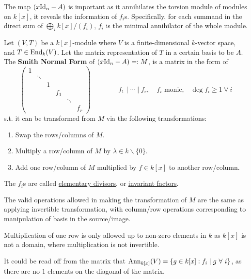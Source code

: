 \documentclass{article}
\begin{document}
The map $(x\mathrm{Id}_n - A)$ is important as it annihilates the torsion module of modules on $k[x]$, it reveals the information of $f_i$s. Specifically, for each summand in the direct sum of $\bigoplus_i k[x]/(f_i)$, $f_i$ is the minimal annihilator of the whole module. 

\begin{definition}
    Let $(V, T)$ be a $k[x]$-module where $V$ is a finite-dimensional $k$-vector space, and $T\in \mathrm{End}_k(V)$. Let the matrix representation of $T$ in a certain basis to be $A$. The \textbf{Smith Normal Form} of $(x\mathrm{Id}_n - A) =: M$, is a matrix in the form of
    \[
        \left(\begin{smallmatrix}
            1 & & & & & \\[0pt]
            & \ddots & & & & \\[0pt]
            & & 1 & & & \\[0pt]
            & & & f_1 & & \\[0pt]
            & & & & \ddots & \\[0pt]
            & & & & & f_r
        \end{smallmatrix}\right) \qquad \qquad f_1\mid \cdots \mid f_r,\quad f_i \text{ monic,}\quad \deg f_i \geq 1\ \forall\ i
    \]
    s.t. it can be transformed from $M$ via the following transformations:
    \begin{enumerate}
        \item Swap the rows/columns of $M$.
        \item Multiply a row/column of $M$ by $\lambda \in k\smallsetminus \{0\}$.
        \item Add one row/column of $M$ multiplied by $f \in k[x]$ to another row/column.
    \end{enumerate}
    The $f_i$s are called \underline{elementary divisors}, or \underline{invariant factors}.
\end{definition}

\begin{remark}
    The valid operations allowed in making the transformation of $M$ are the same as applying invertible transformation, with column/row operations corresponding to manipulation of basis in the source/image.

    Multiplication of one row is only allowed up to non-zero elements in $k$ as $k[x]$ is not a domain, where multiplication is not invertible.
\end{remark}

\begin{remark}
    It could be read off from the matrix that $\Ann_{k[x]}(V) = \{g \in k[x] : f_i \mid g\ \forall\ i\}$, as there are no $1$ elements on the diagonal of the matrix.  
\end{remark}
\end{document}
